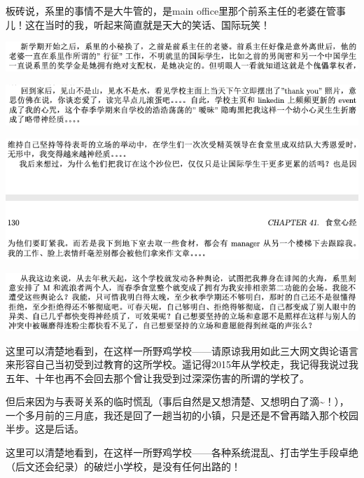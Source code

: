 \documentclass[9pt, b5paper]{article}
\begin{document}
板砖说，系里的事情不是大牛管的，是main office里那个前系主任的老婆在管事儿！这在当时的我，听起来简直就是天大的笑话、国际玩笑！

\begin{center}
\includegraphics[width=.9\linewidth]{./pic/backups_plans_20210424_155833.png}
\end{center}


\begin{center}
\includegraphics[width=.9\linewidth]{./pic/backups_plans_20210424_121459.png}
\end{center}

\begin{center}
\includegraphics[width=.9\linewidth]{./pic/backups_plans_20210424_121700.png}
\end{center}

\begin{center}
\includegraphics[width=.9\linewidth]{./pic/backups_plans_20210424_121752.png}
\end{center}

这里可以清楚地看到，在这样一所野鸡学校——请原谅我用如此三大网文舆论语言来形容自己当初受到过教育的这所学校。遥记得2015年从学校走，我记得我说过我五年、十年也再不会回去那个曾让我受到过深深伤害的所谓的学校了。

但后来因为与表哥关系的临时慌乱（事后自然是又想清楚、又想明白了滴\textasciitilde{}！），一个多月前的三月底，我还是回了一趟当初的小镇，只是还是不曾再踏入那个校园半步。这是后话。

这里可以清楚地看到，在这样一所野鸡学校——各种系统混乱、打击学生手段卓绝（后文还会纪录）的破烂小学校，是没有任何出路的！
\end{document}
